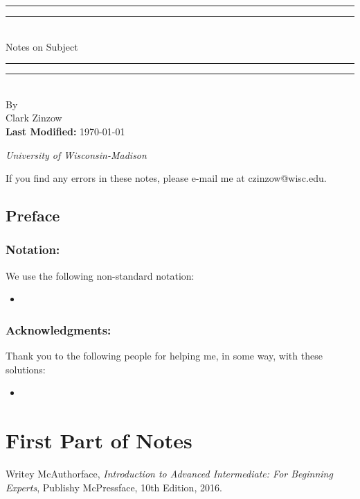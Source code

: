 \documentclass[twoside, titlepage]{amsbook}
\makeatletter
\newcommand{\authorName}{Clark Zinzow}  %
\newcommand{\authorEmail}{czinzow@wisc.edu}  %
\newcommand{\subjectName}{Subject}  %
\newcommand{\institutionName}{University of Wisconsin-Madison}  %
\newcommand{\lastmodified}{\today}  %
\theoremstyle{plain} %
\theoremstyle{definition}
\theoremstyle{remark}
\theoremstyle{notation}
\makeatother
\begin{document}
	
\begin{titlepage}
	\centering
	\vspace*{\baselineskip}
	\rule{\textwidth}{1.6pt}\vspace*{-\baselineskip}\vspace*{2pt}
	\rule{\textwidth}{0.4pt}\\[\baselineskip]
	{\Huge Notes on \subjectName }
	\rule{\textwidth}{0.4pt}\vspace*{-\baselineskip}\vspace*{3pt}
	\rule{\textwidth}{1.6pt}\\[\baselineskip]
	\vspace*{4\baselineskip}
	\huge By \\[\baselineskip]
	{ \authorName}\\[\baselineskip]
	\vspace*{3\baselineskip}
	\huge \textbf{Last Modified:} { \lastmodified } \par
	\vspace*{3\baselineskip}
	\huge {\itshape \institutionName \par}
	\vfill
	{ If you find any errors in these notes, please e-mail me at \authorEmail. \par}
\end{titlepage}

\tableofcontents

\blindmathtrue

\chapter*{Preface}

	\section*{Notation:}
		We use the following non-standard notation:
		\begin{itemize}
			\item 
		\end{itemize}
	
	\section*{Acknowledgments:}
		Thank you to the following people for helping me, in some way, with these solutions:
		\begin{itemize}
			\item 
		\end{itemize}

\part{First Part of Notes}

\blinddocument

\begin{thebibliography}{"McAuthorface16"}
	Writey McAuthorface,
	\emph{Introduction to Advanced Intermediate: For Beginning Experts},
	Publishy McPressface,
	10th Edition,
	2016.
\end{thebibliography}
\end{document}
